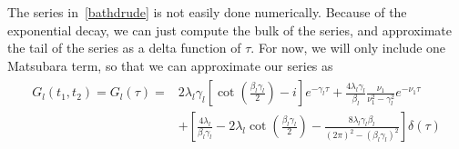 \documentclass{article}
\newcommand{\ten}{\otimes}
\newcommand{\I}{\mathcal{I}}
\begin{document}
The series in~\ref{bathdrude} is not easily done numerically. Because of the exponential decay, we can just compute the bulk of the series, and approximate the tail of the series as a delta function of $\tau$. For now, we will only include one Matsubara term, so that we can approximate our series as
\begin{align}\label{corrapprox}
\begin{split}
G_l(t_1,t_2) = G_l(\tau) = &2\lambda_l\gamma_l\left[\cot\left(\frac{\beta_l\gamma_l}{2}\right)-i\right]e^{-\gamma_l\tau}+\frac{4\lambda_l\gamma_l}{\beta_l}\frac{\nu_1}{\nu_1^2-\gamma_l^2}e^{-\nu_1\tau}\\
&+\left[\frac{4\lambda_l}{\beta_l\gamma_l}-2\lambda_l\cot\left(\frac{\beta_l\gamma_l}{2}\right) - \frac{8\lambda_l\gamma_l\beta_l}{(2\pi)^2-(\beta_l\gamma_l)^2}\right]\delta(\tau)
\end{split}
\end{align}

%
%
%
%
%
\end{document}
